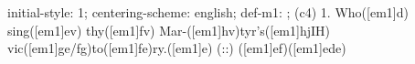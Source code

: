 initial-style: 1;
centering-scheme: english;
def-m1: \grealign;
(c4) 1. Who([em1]d) sing([em1]ev) thy([em1]fv) Mar-([em1]hv)tyr's([em1]hjIH) vic([em1]ge/fg)to([em1]fe)ry.([em1]e) (::) ([em1]ef)([em1]ede)